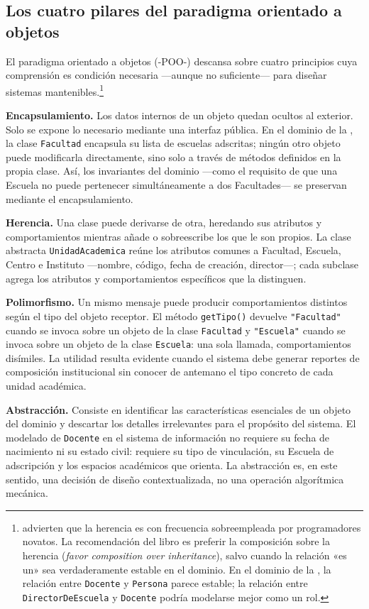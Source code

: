 \subsection*{Los cuatro pilares del paradigma orientado a objetos}

El paradigma orientado a objetos (-POO-) descansa sobre cuatro principios cuya
comprensión es condición necesaria ---aunque no suficiente--- para diseñar
sistemas mantenibles.\footnote{%
  \textcite{Gamma1994} advierten que la herencia es con frecuencia
  sobreempleada por programadores novatos. La recomendación del libro
  es preferir la composición sobre la herencia (\textit{favor composition over
  inheritance}), salvo cuando la relación «es un» sea verdaderamente estable
  en el dominio. En el dominio de la \ud, la relación entre \texttt{Docente}
  y \texttt{Persona} parece estable; la relación entre
  \texttt{DirectorDeEscuela} y \texttt{Docente} podría modelarse mejor
  como un rol.}

\textbf{Encapsulamiento.} Los datos internos de un objeto quedan ocultos
al exterior. Solo se expone lo necesario mediante una interfaz pública.
En el dominio de la \ud, la clase \texttt{Facultad} encapsula su lista
de escuelas adscritas; ningún otro objeto puede modificarla directamente,
sino solo a través de métodos definidos en la propia clase.
Así, los invariantes del dominio ---como el requisito de que una Escuela
no puede pertenecer simultáneamente a dos Facultades--- se preservan
mediante el encapsulamiento.

\textbf{Herencia.} Una clase puede derivarse de otra, heredando sus atributos
y comportamientos mientras añade o sobreescribe los que le son propios.
La clase abstracta \texttt{UnidadAcademica} reúne los atributos comunes
a Facultad, Escuela, Centro e Instituto ---nombre, código, fecha de creación,
director---; cada subclase agrega los atributos y comportamientos específicos
que la distinguen.

\textbf{Polimorfismo.} Un mismo mensaje puede producir comportamientos distintos
según el tipo del objeto receptor. El método \texttt{getTipo()} devuelve
\texttt{"Facultad"} cuando se invoca sobre un objeto de la clase
\texttt{Facultad} y \texttt{"Escuela"} cuando se invoca sobre un objeto
de la clase \texttt{Escuela}: una sola llamada, comportamientos disímiles.
La utilidad resulta evidente cuando el sistema debe generar reportes de
composición institucional sin conocer de antemano el tipo concreto de cada
unidad académica.

\textbf{Abstracción.} Consiste en identificar las características esenciales
de un objeto del dominio y descartar los detalles irrelevantes para el
propósito del sistema. El modelado de \texttt{Docente} en el sistema de
información no requiere su fecha de nacimiento ni su estado civil: requiere
su tipo de vinculación, su Escuela de adscripción y los espacios académicos
que orienta. La abstracción es, en este sentido, una decisión de diseño
contextualizada, no una operación algorítmica mecánica.

